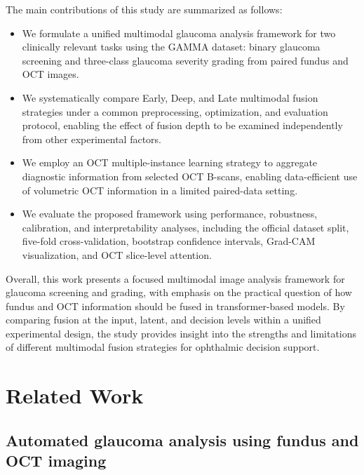 \documentclass[preprint,12pt]{elsarticle}
\begin{document}
The main contributions of this study are summarized as follows:

\begin{itemize}
    \item We formulate a unified multimodal glaucoma analysis framework for two clinically relevant tasks using the GAMMA dataset: binary glaucoma screening and three-class glaucoma severity grading from paired fundus and OCT images.

    \item We systematically compare Early, Deep, and Late multimodal fusion strategies under a common preprocessing, optimization, and evaluation protocol, enabling the effect of fusion depth to be examined independently from other experimental factors.

    \item We employ an OCT multiple-instance learning strategy to aggregate diagnostic information from selected OCT B-scans, enabling data-efficient use of volumetric OCT information in a limited paired-data setting.

    \item We evaluate the proposed framework using performance, robustness, calibration, and interpretability analyses, including the official dataset split, five-fold cross-validation, bootstrap confidence intervals, Grad-CAM visualization, and OCT slice-level attention.
\end{itemize}

Overall, this work presents a focused multimodal image analysis framework for glaucoma screening and grading, with emphasis on the practical question of how fundus and OCT information should be fused in transformer-based models. By comparing fusion at the input, latent, and decision levels within a unified experimental design, the study provides insight into the strengths and limitations of different multimodal fusion strategies for ophthalmic decision support.

\section{Related Work}
\label{sec:related_work}

\subsection{Automated glaucoma analysis using fundus and OCT imaging}
\label{subsec:fundus_oct_glaucoma_analysis}
\end{document}
